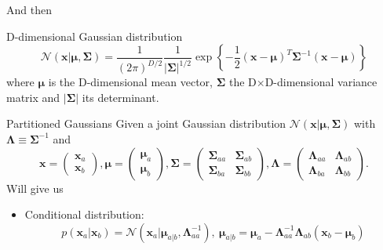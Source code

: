 \begin{frame}{\insertsubsection}
And then
\begin{block}{D-dimensional Gaussian distribution}
\begin{equation*}
	\mathcal{N}(\mathbf{x} | \boldsymbol{\mu}, \boldsymbol{\Sigma}) = \frac{1}{(2 \pi )^{D/2}} \frac{1}{|\boldsymbol{\Sigma}|^{1/2}} \exp \left\{ -\frac{1}{2} (\mathbf{x} - \boldsymbol{\mu})^T \boldsymbol{\Sigma} ^{-1} (\mathbf{x} - \boldsymbol{\mu})  \right\} 
\end{equation*}
where $\boldsymbol{\mu}$ is the D-dimensional mean vector, $\boldsymbol{\Sigma}$ the D$\times$D-dimensional variance matrix and $|\boldsymbol{\Sigma}|$ its determinant.
\end{block}
\end{frame}

\begin{frame}{\insertsubsection}

\begin{block}{Partitioned Gaussians}
Given a joint Gaussian distribution $\mathcal{N}(\mathbf{x} | \boldsymbol{\mu}, \boldsymbol{\Sigma})$ with $\boldsymbol{\Lambda} \equiv \boldsymbol{\Sigma}^{-1}$ and
\begin{equation*}
	\mathbf{x} = 
	 \begin{pmatrix}
		\mathbf{x} _{a} \\
		\mathbf{x} _{b}
	\end{pmatrix} , 
	\boldsymbol{\mu} = 
	 \begin{pmatrix}
		\boldsymbol{\mu}_{a} \\
		\boldsymbol{\mu}_{b}
	\end{pmatrix} , 
	 \boldsymbol{\Sigma} = 
	 \begin{pmatrix}
		\boldsymbol{\Sigma}_{aa} & \boldsymbol{\Sigma}_{ab} \\
		\boldsymbol{\Sigma}_{ba} & \boldsymbol{\Sigma}_{bb} 
	\end{pmatrix} ,  \boldsymbol{\Lambda} = 
	 \begin{pmatrix}
		\boldsymbol{\Lambda}_{aa} & \boldsymbol{\Lambda}_{ab} \\
		\boldsymbol{\Lambda}_{ba} & \boldsymbol{\Lambda}_{bb} 
	\end{pmatrix}.
\end{equation*}
Will give us \\
\begin{itemize}
\item \textcolor{UniGold}{Conditional distribution:}
\begin{equation*}
p\left( \mathbf{x}_a | \mathbf{x}_b \right) = \mathcal{N}\left( \mathbf{x}_a| \boldsymbol{\mu}_{a|b}, \boldsymbol{\Lambda}^{-1}_{aa} \right), \  \boldsymbol{\mu}_{a|b} =  \boldsymbol{\mu}_a - \boldsymbol{\Lambda}^{-1}_{aa}\boldsymbol{\Lambda}_{ab} \left( \mathbf{x}_b - \boldsymbol{\mu}_b \right)
\end{equation*}


\end{itemize}
\end{block}
\end{frame}

